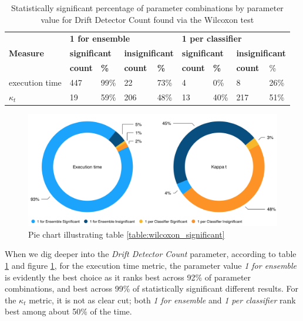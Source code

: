 \begin{table}[]
\centering
\caption{\label{table:wilcoxon_drift_detector_count}Statistically significant percentage of parameter combinations by parameter value for Drift Detector Count found via the Wilcoxon test}
\begin{tabular}{|l|l|l|l|l|l|l|l|l|}
\hline
\multirow{3}{*}{\textbf{Measure}} & \multicolumn{4}{l|}{\textbf{1 for ensemble}} & \multicolumn{4}{l|}{\textbf{1 per classifier}} \\ \cline{2-9} 
 & \multicolumn{2}{l|}{\textbf{significant}} & \multicolumn{2}{l|}{\textbf{insignificant}} & \multicolumn{2}{l|}{\textbf{significant}} & \multicolumn{2}{l|}{\textbf{insignificant}} \\ \cline{2-9} 
 & \textbf{count} & \textbf{\%} & \textbf{count} & \textbf{\%} & \textbf{count} & \textbf{\%} & \textbf{count} & \% \\ \hline \hhline{=========}
execution time & 447 & 99\% & 22 & 73\% & 4 & 0\% & 8 & 26\% \\ \hline
$\kappa_t$ & 19 & 59\% & 206 & 48\% & 13 & 40\% & 217 & 51\% \\ \hline
\end{tabular}
\end{table}


\begin{figure}
\centering
  \includegraphics[width=\linewidth]{./images/chapter5/wilcoxon_drift_detector_count_pie}
\caption{\label{fig:wilcoxon_drift_detector_count_pie}Pie chart illustrating table \ref{table:wilcoxon_significant}}
\end{figure}



When we dig deeper into the \textit{Drift Detector Count} parameter, according to table \ref{table:wilcoxon_drift_detector_count} and figure \ref{fig:wilcoxon_drift_detector_count_pie}, for the execution time metric, the parameter value \textit{1 for ensemble} is evidently the best choice as it ranks best across 92\% of parameter combinations, and best across 99\% of statistically significant different results. For the $\kappa_t$ metric, it is not as clear cut; both \textit{1 for ensemble} and \textit{1 per classifier} rank best among about 50\% of the time. 

